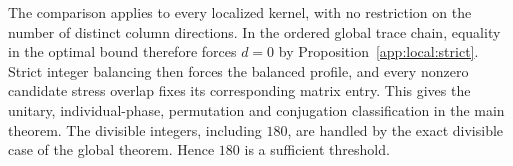 The comparison applies to every localized kernel, with no restriction
on the number of distinct column directions.
In the ordered global trace chain, equality in the optimal bound
therefore forces $d=0$ by Proposition~\ref{app:local:strict}.
Strict integer balancing then forces the balanced profile, and every
nonzero candidate stress overlap fixes its corresponding matrix entry.
This gives the unitary, individual-phase, permutation and conjugation
classification in the main theorem. The divisible
integers, including $180$, are handled by the exact divisible case of
the global theorem. Hence $180$ is a sufficient threshold.
